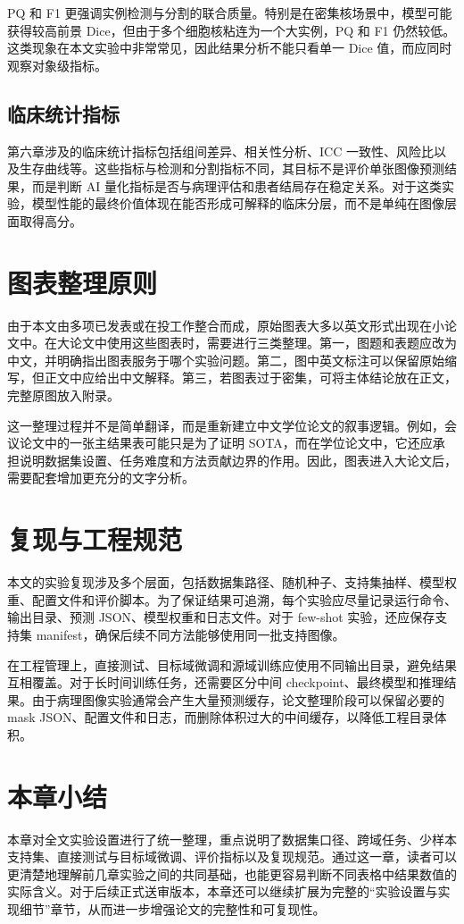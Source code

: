 PQ 和 F1 更强调实例检测与分割的联合质量。特别是在密集核场景中，模型可能获得较高前景 Dice，但由于多个细胞核粘连为一个大实例，PQ 和 F1 仍然较低。这类现象在本文实验中非常常见，因此结果分析不能只看单一 Dice 值，而应同时观察对象级指标。

\subsection{临床统计指标}
第六章涉及的临床统计指标包括组间差异、相关性分析、ICC 一致性、风险比以及生存曲线等。这些指标与检测和分割指标不同，其目标不是评价单张图像预测结果，而是判断 AI 量化指标是否与病理评估和患者结局存在稳定关系。对于这类实验，模型性能的最终价值体现在能否形成可解释的临床分层，而不是单纯在图像层面取得高分。

\section{图表整理原则}
由于本文由多项已发表或在投工作整合而成，原始图表大多以英文形式出现在小论文中。在大论文中使用这些图表时，需要进行三类整理。第一，图题和表题应改为中文，并明确指出图表服务于哪个实验问题。第二，图中英文标注可以保留原始缩写，但正文中应给出中文解释。第三，若图表过于密集，可将主体结论放在正文，完整原图放入附录。

这一整理过程并不是简单翻译，而是重新建立中文学位论文的叙事逻辑。例如，会议论文中的一张主结果表可能只是为了证明 SOTA，而在学位论文中，它还应承担说明数据集设置、任务难度和方法贡献边界的作用。因此，图表进入大论文后，需要配套增加更充分的文字分析。

\section{复现与工程规范}
本文的实验复现涉及多个层面，包括数据集路径、随机种子、支持集抽样、模型权重、配置文件和评价脚本。为了保证结果可追溯，每个实验应尽量记录运行命令、输出目录、预测 JSON、模型权重和日志文件。对于 few-shot 实验，还应保存支持集 manifest，确保后续不同方法能够使用同一批支持图像。

在工程管理上，直接测试、目标域微调和源域训练应使用不同输出目录，避免结果互相覆盖。对于长时间训练任务，还需要区分中间 checkpoint、最终模型和推理结果。由于病理图像实验通常会产生大量预测缓存，论文整理阶段可以保留必要的 mask JSON、配置文件和日志，而删除体积过大的中间缓存，以降低工程目录体积。

\section{本章小结}
本章对全文实验设置进行了统一整理，重点说明了数据集口径、跨域任务、少样本支持集、直接测试与目标域微调、评价指标以及复现规范。通过这一章，读者可以更清楚地理解前几章实验之间的共同基础，也能更容易判断不同表格中结果数值的实际含义。对于后续正式送审版本，本章还可以继续扩展为完整的“实验设置与实现细节”章节，从而进一步增强论文的完整性和可复现性。
